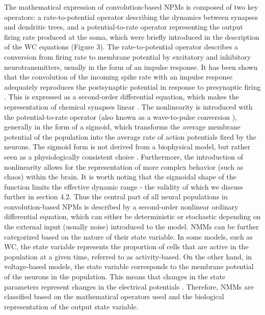 \documentclass[12pt,twoside]{article}
\begin{document}
The mathematical expression of convolution-based NPMs is composed of two key operators: a rate-to-potential operator describing the dynamics between synapses and dendritic trees, and a potential-to-rate operator representing the output firing rate produced at the soma, which were briefly introduced in the description of the WC equations (Figure 3). The rate-to-potential operator describes a conversion from firing rate to membrane potential by excitatory and inhibitory neurotransmitters, usually in the form of an impulse response. It has been shown that the convolution of the incoming spike rate with an impulse response adequately reproduces the postsynaptic potential in response to presynaptic firing \citep{bhattacharya2013implementing}. This is expressed as a second-order differential equation, which makes the representation of chemical synapses linear \citep{rall1962electrophysiology, rall1964theoretical, freeman1975mass,spiegler2012dynamics}. The nonlinearity is introduced with the potential-to-rate 
operator (also known as a wave-to-pulse conversion \citep{freeman1992tutorial, cook2021neural}), generally in the form of a sigmoid, which transforms the average membrane potential of the population into the average rate of action potentials fired by the neurons. The sigmoid form is not derived from a biophysical model, but rather seen as a physiologically consistent choice \citep{coombes2019next}. Furthermore, the introduction of nonlinearity allows for the representation of more complex behavior (such as chaos) within the brain. It is worth noting that the sigmoidal shape of the function limits the effective dynamic range \citep{spiegler2012dynamics} - the validity of which we discuss further in section 4.2.
Thus the central part of all neural populations in convolution-based NPMs is described by a second-order nonlinear ordinary differential equation, which can either be deterministic or stochastic depending on the external input (usually noise) introduced to the model. NMMs can be further categorized based on the nature of their state variable. In some models, such as WC, the state variable represents the proportion of cells that are active in the population at a given time, referred to as activity-based. On the other hand, in voltage-based models, the state variable corresponds to the membrane potential of the neurons in the population. This means that changes in the state parameters represent changes in the electrical potentials \citep{griffiths2022whole}. Therefore, NMMs are classified based on the mathematical operators used and the biological representation of the output state variable.
\end{document}
